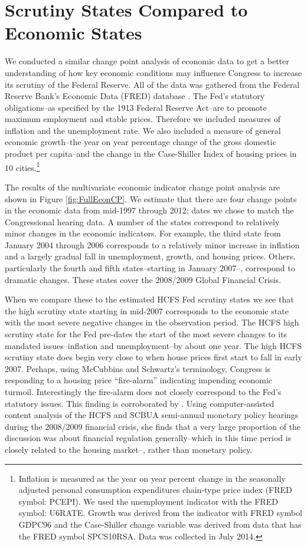 \documentclass[a4paper]{article}\usepackage[]{graphicx}\usepackage[]{color}
\begin{document}
\section{Scrutiny States Compared to Economic States}

We conducted a similar change point analysis of economic data to get a better understanding of how key economic conditions may influence Congress to increase its scrutiny of the Federal Reserve. All of the data was gathered from the Federal Reserve Bank's Economic Data (FRED) database \citep{FRED}. The Fed's statutory obligations--as specified by the 1913 Federal Reserve Act--are to promote maximum employment and stable prices. Therefore we included measures of inflation and the unemployment rate. We also included a measure of general economic growth--the year on year percentage change of the gross domestic product per capita--and the change in the Case-Shiller Index of housing prices in 10 cities.\footnote{Inflation is measured as the year on year percent change in the seasonally adjusted personal consumption expenditures chain-type price index (FRED symbol: PCEPI). We used the unemployment indicator with the FRED symbol: U6RATE. Growth was derived from the indicator with FRED symbol GDPC96 and the Case-Shiller change variable was derived from data that has the FRED symbol SPCS10RSA. Data was collected in July 2014.}

The results of the multivariate economic indicator change point analysis are shown in Figure \ref{fig:FullEconCP}. We estimate that there are four change points in the economic data from mid-1997 through 2012; dates we chose to match the Congressional hearing data. A number of the states correspond to relatively minor changes in the economic indicators. For example, the third state from January 2004 through 2006 corresponds to a relatively minor increase in inflation and a largely gradual fall in unemployment, growth, and housing prices. Others, particularly the fourth and fifth states--starting in January 2007--, correspond to dramatic changes. These states cover the 2008/2009 Global Financial Crisis.

When we compare these to the estimated HCFS Fed scrutiny states we see that the high scrutiny state starting in mid-2007 corresponds to the economic state with the most severe negative changes in the observation period. The HCFS high scrutiny state for the Fed pre-dates the start of the most severe changes to its mandated issues--inflation and unemployment--by about one year. The high HCFS scrutiny state does begin very close to when house prices first start to fall in early 2007.  Perhaps, using McCubbins and Schwartz's \citeyearpar{Mccubbins1984} terminology, Congress is responding to a housing price ``fire-alarm'' indicating impending economic turmoil. Interestingly the fire-alarm does not closely correspond to the Fed's statutory issues. This finding is corroborated by \cite{SchonhardtBailey2012}. Using computer-assisted content analysis of the HCFS and SCBUA semi-annual monetary policy hearings during the 2008/2009 financial crisis, she finds that a very large proportion of the discussion was about financial regulation generally--which in this time period is closely related to the housing market--, rather than monetary policy.
\end{document}
